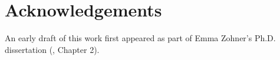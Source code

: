 \section*{Acknowledgements}
An early draft of this work first appeared as part of Emma Zohner's Ph.D. dissertation (\citeyear{zohner_feature_2021}, Chapter 2).